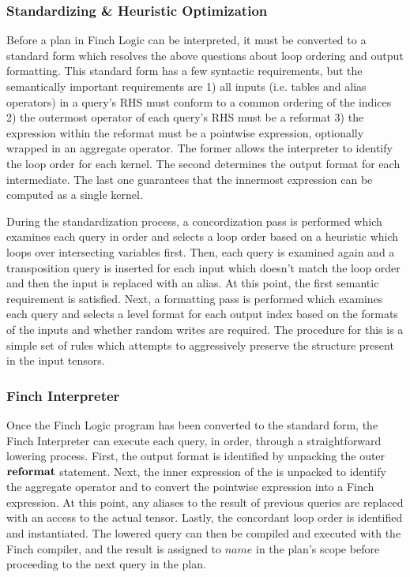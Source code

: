 \subsubsection{Standardizing \& Heuristic Optimization}
Before a plan in Finch Logic can be interpreted, it must be converted to a standard form which resolves the above questions about loop ordering and output formatting. This standard form has a few syntactic requirements, but the semantically important requirements are 1) all inputs (i.e. tables and alias operators) in a query's RHS must conform to a common ordering of the indices 2) the outermost operator of each query's RHS must be a reformat 3) the expression within the reformat must be a pointwise expression, optionally wrapped in an aggregate operator. The former allows the interpreter to identify the loop order for each kernel. The second determines the output format for each intermediate. The last one guarantees that the innermost expression can be computed as a single kernel.

During the standardization process, a concordization pass is performed which examines each query in order and selects a loop order based on a heuristic which loops over intersecting variables first. Then, each query is examined again and a transposition query is inserted for each input which doesn't match the loop order and then the input is replaced with an alias. At this point, the first semantic requirement is satisfied. Next, a formatting pass is performed which examines each query and selects a level format for each output index based on the formats of the inputs and whether random writes are required. The procedure for this is a simple set of rules which attempts to aggressively preserve the structure present in the input tensors.


\subsubsection{Finch Interpreter} 
Once the Finch Logic program has been converted to the standard form, the Finch Interpreter can execute each query, in order, through a straightforward lowering process. First, the output format is identified by unpacking the outer $\text{\textbf{reformat}}$ statement. Next, the inner expression of the is unpacked to identify the aggregate operator and to convert the pointwise expression into a Finch expression. At this point, any aliases to the result of previous queries are replaced with an access to the actual tensor. Lastly, the concordant loop order is identified and instantiated. The lowered query can then be compiled and executed with the Finch compiler, and the result is assigned to $name$ in the plan's scope before proceeding to the next query in the plan. 


